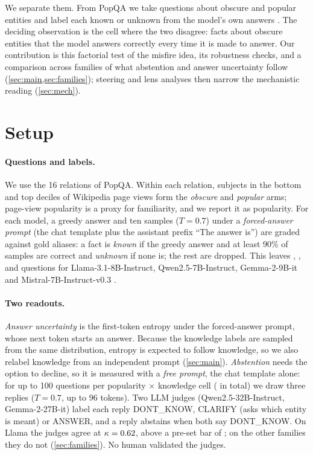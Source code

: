 \documentclass{article}
\begin{document}
We separate them. From PopQA \citep{mallen2023popqa} we take questions about obscure and popular entities and label each known or unknown from the model's own answers \citep{gekhman2024slick}. The deciding observation is the cell where the two disagree: facts about obscure entities that the model answers correctly every time it is made to answer. Our contribution is this factorial test of the misfire idea, its robustness checks, and a comparison across families of what abstention and answer uncertainty follow (\cref{sec:main,sec:families}); steering and lens analyses then narrow the mechanistic reading (\cref{sec:mech}).

\section{Setup}
\label{sec:setup}

\paragraph{Questions and labels.} We use the 16 relations of PopQA. Within each relation, subjects in the bottom and top deciles of Wikipedia page views form the \emph{obscure} and \emph{popular} arms; page-view popularity is a proxy for familiarity, and we report it as popularity. For each model, a greedy answer and ten samples ($T=0.7$) under a \emph{forced-answer prompt} (the chat template plus the assistant prefix ``The answer is'') are graded against gold aliases: a fact is \emph{known} if the greedy answer and at least 90\% of samples are correct and \emph{unknown} if none is; the rest are dropped. This leaves \faLlamaN, \faQwenN, \faGemmaN{} and \faMistralN{} questions for Llama-3.1-8B-Instruct, Qwen2.5-7B-Instruct, Gemma-2-9B-it and Mistral-7B-Instruct-v0.3 \citep{llama3,qwen25,gemma2,mistral7b}.

\paragraph{Two readouts.} \emph{Answer uncertainty} is the first-token entropy under the forced-answer prompt, whose next token starts an answer. Because the knowledge labels are sampled from the same distribution, entropy is expected to follow knowledge, so we also relabel knowledge from an independent prompt (\cref{sec:main}). \emph{Abstention} needs the option to decline, so it is measured with a \emph{free prompt}, the chat template alone: for up to 100 questions per popularity $\times$ knowledge cell (\hmLlamaItems{} in total) we draw three replies ($T=0.7$, up to 96 tokens). Two LLM judges (Qwen2.5-32B-Instruct, Gemma-2-27B-it) label each reply DONT\_KNOW, CLARIFY (asks which entity is meant) or ANSWER, and a reply abstains when both say DONT\_KNOW. On Llama the judges agree at $\kappa=0.62$, above a pre-set bar of \kappaBar; on the other families they do not (\cref{sec:families}). No human validated the judges.
\end{document}
